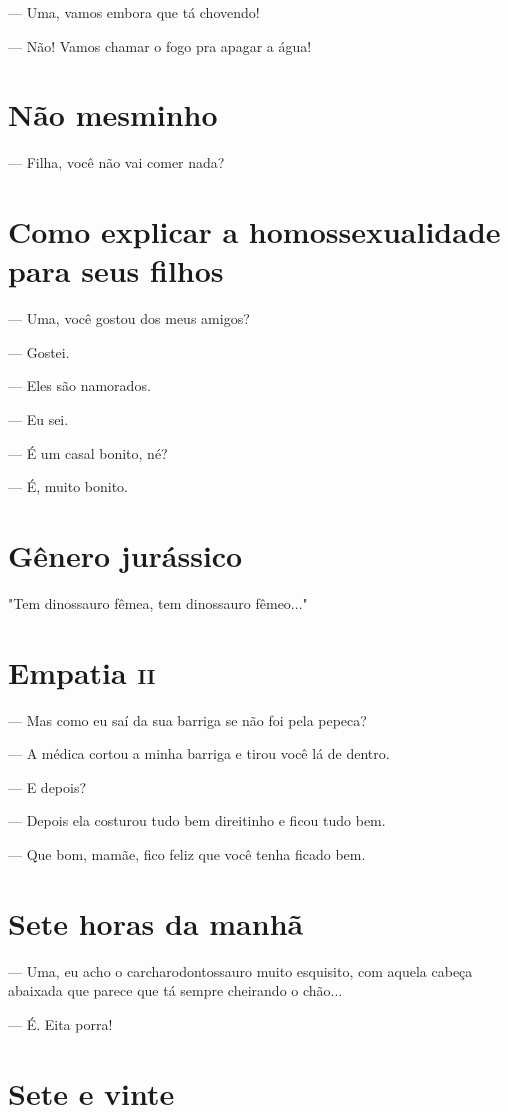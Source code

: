 {— Uma, vamos embora que tá chovendo!

— Não! Vamos chamar o fogo pra apagar a água!

\chapter{Não mesminho}

— Filha, você não vai comer nada?

\chapter{Como explicar a homossexualidade para seus filhos}

— Uma, você gostou dos meus amigos?

— Gostei.

— Eles são namorados.

— Eu sei.

— É um casal bonito, né?

— É, muito bonito.

\chapter{Gênero jurássico}

"Tem dinossauro fêmea, tem dinossauro fêmeo..."

\chapter{Empatia \textsc{ii}}

— Mas como eu saí da sua barriga se não foi pela pepeca?

— A médica cortou a minha barriga e tirou você lá de dentro.

— E depois?

— Depois ela costurou tudo bem direitinho e ficou tudo bem.

— Que bom, mamãe, fico feliz que você tenha ficado bem.

\chapter{Sete horas da manhã}

— Uma, eu acho o carcharodontossauro muito esquisito, com aquela cabeça
abaixada que parece que tá sempre cheirando o chão...

— É. Eita porra!

\chapter{Sete e vinte}

}
